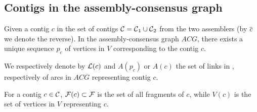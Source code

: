 \subsection{Contigs in the assembly-consensus graph}

Given a contig \(c\) in the set of contigs \(\mathcal{C}{} = \mathcal{C}{}_1 \cup \mathcal{C}{}_2\) from the two assemblers (by \(\overline{c}\) we denote the reverse).
In the assembly-consensus graph \(ACG\), there exists a unique sequence \(p_c\) of vertices in \(V\) corresponding to the contig \(c\).

We respectively denote by \(\mathcal{L}{}(c)\) and \(A(p_c)\) or \(A(c)\) the set of links in \Links{}, respectively of arcs in \(ACG\) representing contig \(c\).

For a contig \(c \in \mathcal{C}{}\), \(\mathcal{F}{}(c) \subset \mathcal{F}{}\) is the set of all fragments of \(c\), while \(V(c)\) is the set of vertices in \(V\) representing \(c\).
